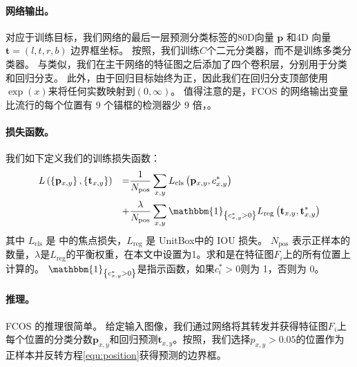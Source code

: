 \documentclass[../main.tex]{subfile}
\begin{document}
\paragraph{网络输出。}

对应于训练目标，我们网络的最后一层预测分类标签的80D向量 $\mathbf{p}$ 和4D 向量 $\mathbf{t} = \left(l, t, r, b\right)$ 边界框坐标。 按照\cite{retinanet}，我们训练$ C $个二元分类器，而不是训练多类分类器。 与\cite{retinanet}类似，我们在主干网络的特征图之后添加了四个卷积层，分别用于分类和回归分支。 此外，由于回归目标始终为正，因此我们在回归分支顶部使用$ \exp\left(x\right) $来将任何实数映射到$\left(0, \infty \right)$。 值得注意的是，FCOS 的网络输出变量比流行的每个位置有 9 个锚框的检测器\cite{retinanet, fasterrcnn}少 9 倍，。

\paragraph{损失函数。}

我们如下定义我们的训练损失函数：
\begin{equation} \label{equ:total_loss}
    \begin{aligned}
         & L\left(\left\{\mathbf{p}_{x,y}\right\},\left\{\mathbf{t}_{x,y}\right\}\right) & = & \frac{1}{N_\text{pos}}\sum_{x,y}L_\text{cls}\left( \mathbf{p}_{x,y}, c_{x,y}^\ast \right)                                                               \\
         &                                                                               & + & \frac{\lambda}{N_\text{pos}} \sum_{x, y}\mathbbm{1}_{\left\{c_{x,y}^\ast > 0\right\}}L_\text{reg}\left( \mathbf{t}_{x,y}, \mathbf{t}_{x,y}^\ast \right)
    \end{aligned}
\end{equation}
其中 $L_\text{cls}$ 是 \cite{retinanet}中的焦点损失，$L_\text{reg}$ 是 UnitBox\cite{unitbox}中的 IOU 损失。 $N_\text{pos}$ 表示正样本的数量，$\lambda$是$L_\text{reg} $的平衡权重，在本文中设置为1。求和是在特征图$ F_i $上的所有位置上计算的。 $\mathbbm{1}_{\left\{c_{x,y}^\ast > 0\right\}}$是指示函数，如果$ c^\ast_i > 0 $则为 1，否则为 0。

\paragraph{推理。}

FCOS 的推理很简单。 给定输入图像，我们通过网络将其转发并获得特征图$ F_i $上每个位置的分类分数$\mathbf{p}_{x,y}$和回归预测$\mathbf{t}_{x,y}$。按照\cite{retinanet}，我们选择$p_{x,y} > 0.05 $的位置作为正样本并反转方程\ref{equ:position}获得预测的边界框。
\end{document}
